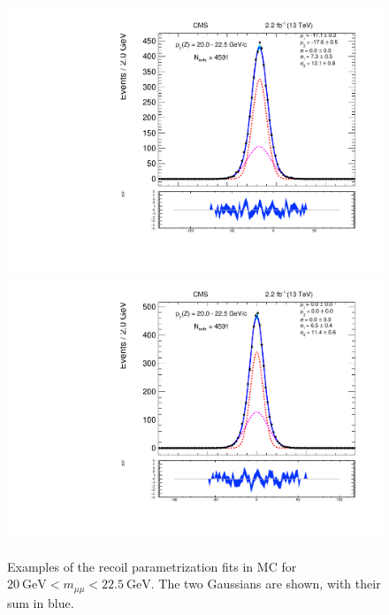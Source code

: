 \begin{figure}
\centering
\includegraphics[width=0.49\linewidth]{plots/Recoil/example-mc-pfu1fit_12.pdf}
\includegraphics[width=0.49\linewidth]{plots/Recoil/example-mc-pfu2fit_12.pdf}
\caption{Examples of the recoil parametrization fits in MC for $20~\mathrm{GeV} < m_{\mu\mu}  < 22.5~\mathrm{GeV}$. The two Gaussians are shown, with their sum in blue.}
\label{fig:recoil:mc_fit_example}
\end{figure}